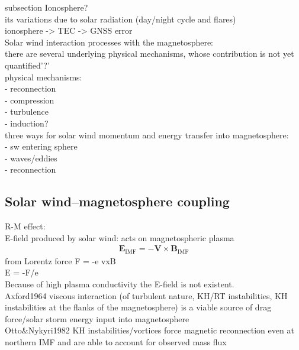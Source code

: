 subsection Ionosphere?\\
its variations due to solar radiation (day/night cycle and flares)\\
ionosphere -> TEC -> GNSS error\\


Solar wind interaction processes with the magnetosphere:\\
there are several underlying physical mechanisms, whose contribution is not yet quantified'?'\\
physical mechanisms:\\
- reconnection\\
- compression\\
- turbulence\\
- induction?\\

three ways for solar wind momentum and energy transfer into magnetosphere:\\
- sw entering sphere\\
- waves/eddies\\
- reconnection\\


\subsection{Solar wind--magnetosphere coupling}
\label{sec:solar_wind_magnetosphere_coupling}

R-M effect:\\
E-field produced by solar wind:	%
acts on magnetospheric plasma\\
\begin{align}
	\textbf{E}_\text{IMF} = -\textbf{V} \times \textbf{B}_\text{IMF}
\end{align}
from Lorentz force F = -e vxB\\
E = -F/e\\
Because of high plasma conductivity the E-field is not existent.\\

Axford1964 viscous interaction (of turbulent nature, KH/RT instabilities, KH instabilities at the flanks of the magnetosphere) is a viable source of drag force/solar storm energy input into magnetosphere\\

Otto\&Nykyri1982 KH instabilities/vortices force magnetic reconnection even at northern IMF and are able to account for observed mass flux\\

